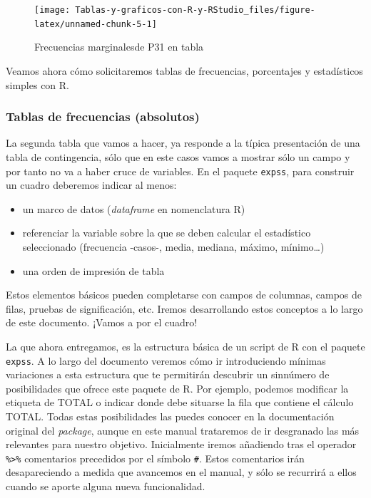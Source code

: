\documentclass[
]{book}
\providecommand{\tightlist}{%
  \setlength{\itemsep}{0pt}\setlength{\parskip}{0pt}}
\begin{document}
\begin{figure}[H]

{\centering \texttt{[image: Tablas-y-graficos-con-R-y-RStudio\_files/figure-latex/unnamed-chunk-5-1]} 

}

\caption{Frecuencias marginalesde P31 en tabla}\label{fig:unnamed-chunk-5}
\end{figure}

Veamos ahora cómo solicitaremos tablas de frecuencias, porcentajes y estadísticos simples con R.

\hypertarget{tablas-de-frecuencias-absolutos}{%
\subsubsection{Tablas de frecuencias (absolutos)}\label{tablas-de-frecuencias-absolutos}}

La segunda tabla que vamos a hacer, ya responde a la típica presentación de una tabla de contingencia, sólo que en este casos vamos a mostrar sólo un campo y por tanto no va a haber cruce de variables. En el paquete \texttt{expss}, para construir un cuadro deberemos indicar al menos:

\begin{itemize}
\tightlist
\item
  un marco de datos (\emph{dataframe} en nomenclatura R)
\item
  referenciar la variable sobre la que se deben calcular el estadístico seleccionado (frecuencia -casos-, media, mediana, máximo, mínimo\ldots)
\item
  una orden de impresión de tabla
\end{itemize}

Estos elementos básicos pueden completarse con campos de columnas, campos de filas, pruebas de significación, etc. Iremos desarrollando estos conceptos a lo largo de este documento. ¡Vamos a por el cuadro!

La que ahora entregamos, es la estructura básica de un script de R con el paquete \texttt{expss}. A lo largo del documento veremos cómo ir introduciendo mínimas variaciones a esta estructura que te permitirán descubrir un sinnúmero de posibilidades que ofrece este paquete de R. Por ejemplo, podemos modificar la etiqueta de TOTAL o indicar donde debe situarse la fila que contiene el cálculo TOTAL. Todas estas posibilidades las puedes conocer en la documentación original del \emph{package}, aunque en este manual trataremos de ir desgranado las más relevantes para nuestro objetivo. Inicialmente iremos añadiendo tras el operador \texttt{\%\textgreater{}\%} comentarios precedidos por el símbolo \texttt{\#}. Estos comentarios irán desapareciendo a medida que avancemos en el manual, y sólo se recurrirá a ellos cuando se aporte alguna nueva funcionalidad.
\end{document}
